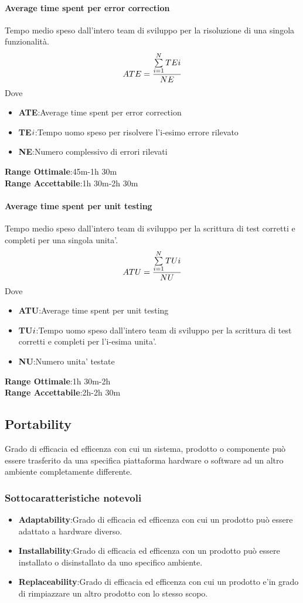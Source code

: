 \paragraph{Average time spent per error correction}
\begin{flushleft}
Tempo medio speso dall'intero team di sviluppo per la risoluzione di una singola funzionalità.
	$$ATE=\frac{\sum\limits_{i=1}^N TE{\small{i}}}{NE}$$
Dove
\begin{itemize}
	\item{\textbf{ATE}}:Average time spent per error correction
	\item{\textbf{TE${\small{i}}$}}:Tempo uomo speso per risolvere l'i-esimo errore rilevato
	\item{\textbf{NE}}:Numero complessivo di errori rilevati
\end{itemize}
\textbf{Range Ottimale}:45m-1h 30m \\
\textbf{Range Accettabile}:1h 30m-2h 30m
\end{flushleft}
\paragraph{Average time spent per unit testing}
\begin{flushleft}
Tempo medio speso dall'intero team di sviluppo per la scrittura di test corretti e completi per una singola unita'.
	$$ATU=\frac{\sum\limits_{i=1}^N TU{\small{i}}}{NU}$$
Dove
\begin{itemize}
	\item{\textbf{ATU}}:Average time spent per unit testing
	\item{\textbf{TU${\small{i}}$}}:Tempo uomo speso dall'intero team di sviluppo per la scrittura di test corretti e completi per l'i-esima unita'.
	\item{\textbf{NU}}:Numero unita' testate
\end{itemize}
\textbf{Range Ottimale}:1h 30m-2h \\
\textbf{Range Accettabile}:2h-2h 30m
\end{flushleft}
\subsection{Portability}
Grado di efficacia ed efficenza con cui un sistema, prodotto o componente può essere trasferito da una specifica piattaforma hardware o software ad un altro ambiente completamente differente.
\subsubsection{Sottocaratteristiche notevoli}
\begin{itemize}
	\item{\textbf{Adaptability}}:Grado di efficacia ed efficenza con cui un prodotto può essere adattato a hardware diverso.
	\item{\textbf{Installability}}:Grado di efficacia ed efficenza con un prodotto può essere installato o disinstallato da uno specifico ambiente.
	\item{\textbf{Replaceability}}:Grado di efficacia ed efficenza con cui un prodotto e'in grado di rimpiazzare un altro prodotto con lo stesso scopo.
\end{itemize}
\pagebreak
